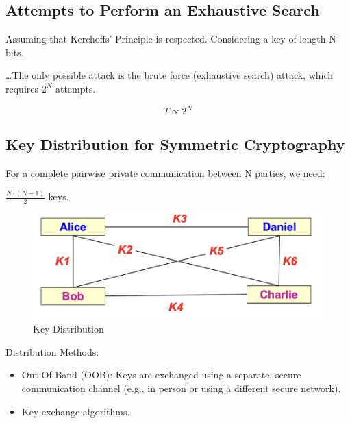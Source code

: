 \subsection*{Attempts to Perform an Exhaustive Search}
Assuming that Kerchoffs' Principle is respected. Considering a key of length N bits.

\dots The only possible attack is the brute force (exhaustive search) attack, which requires $2^N$ attempts.

\[
    \boxed{T \propto 2^N}
\]

\subsection{Key Distribution for Symmetric Cryptography}
\raggedcolumns
\begin{multicols}{2}

\noindent For a complete pairwise private communication between N parties, we need:
\begin{center}
    $\boxed{\displaystyle\frac{N \cdot (N-1)}{2}}$ keys.
\end{center}

\columnbreak

    \begin{figure}[H]
        \centering
        \includegraphics[width=\linewidth]{Images/Cryptography/key_dist_symm.png}
        \caption{Key Distribution}
    \end{figure}
\end{multicols}


Distribution Methods:
\begin{itemize}
    \item Out-Of-Band (OOB): Keys are exchanged using a separate, secure communication channel (e.g., in person or using a different secure network).
    \item Key exchange algorithms.
\end{itemize}


